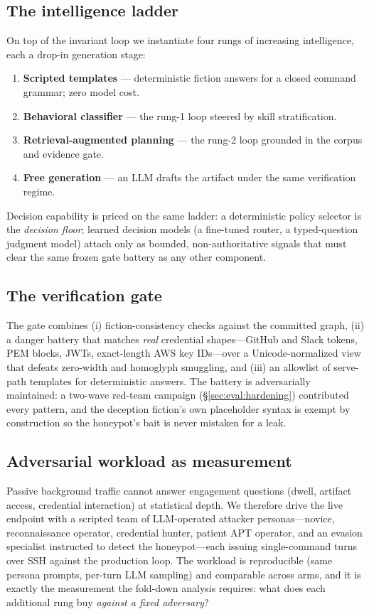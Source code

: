 \subsection{The intelligence ladder}
\label{sec:design:ladder}
On top of the invariant loop we instantiate four rungs of increasing
intelligence, each a drop-in generation stage:
\begin{enumerate}
  \item \textbf{Scripted templates} --- deterministic fiction answers for a
  closed command grammar; zero model cost.
  \item \textbf{Behavioral classifier} --- the rung-1 loop steered by skill
  stratification.
  \item \textbf{Retrieval-augmented planning} --- the rung-2 loop grounded in
  the corpus and evidence gate.
  \item \textbf{Free generation} --- an LLM drafts the artifact under the same
  verification regime.
\end{enumerate}
Decision capability is priced on the same ladder: a deterministic policy
selector is the \emph{decision floor}; learned decision models (a fine-tuned
router, a typed-question judgment model) attach only as bounded, non-authoritative
signals that must clear the same frozen gate battery as any other component.

\subsection{The verification gate}
\label{sec:design:gate}
The gate combines (i) fiction-consistency checks against the committed graph,
(ii) a danger battery that matches \emph{real} credential shapes---GitHub and
Slack tokens, PEM blocks, JWTs, exact-length AWS key IDs---over a
Unicode-normalized view that defeats zero-width and homoglyph smuggling, and
(iii) an allowlist of serve-path templates for deterministic answers. The
battery is adversarially maintained: a two-wave red-team campaign
(\S\ref{sec:eval:hardening}) contributed every pattern, and the deception
fiction's own placeholder syntax is exempt by construction so the honeypot's
bait is never mistaken for a leak.

\subsection{Adversarial workload as measurement}
\label{sec:design:workload}
Passive background traffic cannot answer engagement questions (dwell, artifact
access, credential interaction) at statistical depth. We therefore drive the
live endpoint with a scripted team of LLM-operated attacker personas---novice,
reconnaissance operator, credential hunter, patient APT operator, and an
evasion specialist instructed to detect the honeypot---each issuing
single-command turns over SSH against the production loop. The workload is
reproducible (same persona prompts, per-turn LLM sampling) and comparable
across arms, and it is exactly the measurement the fold-down analysis
requires: what does each additional rung buy \emph{against a fixed adversary}?
